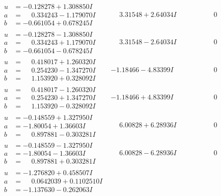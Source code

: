 \documentclass[1p]{elsarticle_modified}
\theoremstyle{definition}
\begin{document}
$$\begin{array}{c|c|c}
\begin{aligned}
u &= -0.128278 + 1.308850 I \\
a &= \phantom{-}0.334243 - 1.179070 I \\
b &= -0.661054 + 0.678245 I\end{aligned}
 & \phantom{-}3.31548 + 2.64034 I & \phantom{-0.000000 } 0 \\ \hline\begin{aligned}
u &= -0.128278 - 1.308850 I \\
a &= \phantom{-}0.334243 + 1.179070 I \\
b &= -0.661054 - 0.678245 I\end{aligned}
 & \phantom{-}3.31548 - 2.64034 I & \phantom{-0.000000 } 0 \\ \hline\begin{aligned}
u &= \phantom{-}0.418017 + 1.260320 I \\
a &= \phantom{-}0.254230 - 1.347270 I \\
b &= \phantom{-}1.153920 + 0.328092 I\end{aligned}
 & -1.18466 - 4.83399 I & \phantom{-0.000000 } 0 \\ \hline\begin{aligned}
u &= \phantom{-}0.418017 - 1.260320 I \\
a &= \phantom{-}0.254230 + 1.347270 I \\
b &= \phantom{-}1.153920 - 0.328092 I\end{aligned}
 & -1.18466 + 4.83399 I & \phantom{-0.000000 } 0 \\ \hline\begin{aligned}
u &= -0.148559 + 1.327950 I \\
a &= -1.80054 + 1.36603 I \\
b &= \phantom{-}0.897881 - 0.303281 I\end{aligned}
 & \phantom{-}6.00828 + 6.28936 I & \phantom{-0.000000 } 0 \\ \hline\begin{aligned}
u &= -0.148559 - 1.327950 I \\
a &= -1.80054 - 1.36603 I \\
b &= \phantom{-}0.897881 + 0.303281 I\end{aligned}
 & \phantom{-}6.00828 - 6.28936 I & \phantom{-0.000000 } 0 \\ \hline\begin{aligned}
u &= -1.276820 + 0.458507 I \\
a &= \phantom{-}0.0642039 + 0.1102510 I \\
b &= -1.137630 - 0.262063 I\end{aligned}

\end{array}$$
\end{document}
